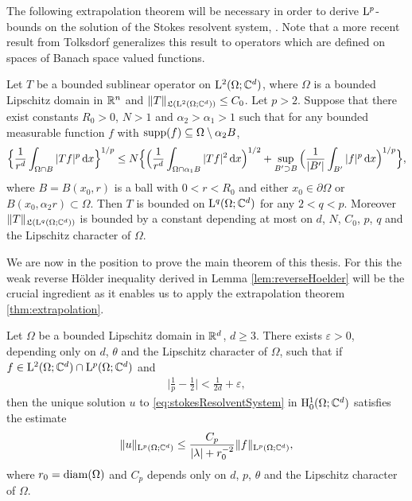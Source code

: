 The following extrapolation theorem will be necessary in order to derive $\mathrm{L}^p$-bounds on the solution of the Stokes resolvent system, \cite[Thm. 3.3]{shenExtrapolation}.
Note that a more recent result from Tolksdorf \cite{tolksdorfExtra} generalizes this result to operators which are defined on spaces of Banach space valued functions.

\begin{thm}
  \label{thm:extrapolation}
  Let $T$ be a bounded sublinear operator on $\mathrm{L}^2(\Omega; \mathbb{C}^d)$, where $\Omega$ is a bounded Lipschitz domain in $\mathbb{R}^n$ and $\|T\|_{\mathfrak{L}(\mathrm{L}^2(\Omega; \mathbb{C}^d))} \leq C_0$.
  Let $p > 2$.
  Suppose that there exist constants $R_0 > 0$, $N > 1$ and $\alpha_2 > \alpha_1 > 1$ such that for any bounded measurable function $f$ with $\operatorname{supp}(f) \subseteq \Omega \setminus \alpha_2 B$,
  \begin{align*}
    \Big\{ \frac{1}{r^d} \int_{\Omega \cap B} |Tf|^p \, {\operatorname{d}\!{x}} \Big\}^{1/p}
    \leq N \Big\{ \Big( \frac{1}{r^d} \int_{\Omega \cap \alpha_1 B} |T f|^2 \, {\operatorname{d}\!{x}} \Big)^{1/2} + \sup_{B' \supset B} \Big( \frac{1}{|B'|} \int_{B'} |f|^p \, {\operatorname{d}\!{x}} \Big)^{1/p} \Big\},
  \end{align*}
  where $B = B(x_0, r)$ is a ball with $0 < r < R_0$ and either $x_0 \in \partial\Omega$ or $B(x_0, \alpha_2 r) \subset \Omega$.
  Then $T$ is bounded on $\mathrm{L}^q(\Omega; \mathbb{C}^d)$ for any $2 < q < p$.
  Moreover $\|T\|_{\mathfrak{L}(\mathrm{L}^q(\Omega; \mathbb{C}^d))}$ is bounded by a constant depending at most on $d$, $N$, $C_0$, $p$, $q$ and the Lipschitz character of $\Omega$.
\end{thm}

We are now in the position to prove the main theorem of this thesis. For this the weak reverse H\"older inequality derived in Lemma \ref{lem:reverseHoelder} will be the crucial ingredient as it enables us to apply the extrapolation theorem \ref{thm:extrapolation}.

\begin{thm}[Shen]
  Let $\Omega$ be a bounded Lipschitz domain in $\mathbb{R}^d$, $d \geq 3$.
  There exists $\varepsilon > 0$, depending only on $d$, $\theta$ and the Lipschitz character of $\Omega$, such that if $f \in \mathrm{L}^2(\Omega; \mathbb{C}^d) \cap \mathrm{L}^p(\Omega; \mathbb{C}^d)$ and 
  \begin{align*}
    \Big| \frac{1}{p} - \frac{1}{2} \Big| < \frac{1}{2d} + \varepsilon,
  \end{align*}
  then the unique solution $u$ to \eqref{eq:stokesResolventSystem} in $\mathrm{H}_0^1(\Omega; \mathbb{C}^d)$ satisfies the estimate
  \begin{align*}
    \|u\|_{\mathrm{L}^p(\Omega; \mathbb{C}^d)} \leq \frac{C_p}{|\lambda| + r_0^{-2}} \|f\|_{\mathrm{L}^p(\Omega; \mathbb{C}^d)},
  \end{align*}
  where $r_0 = \operatorname{diam}(\Omega)$ and $C_p$ depends only on $d$, $p$, $\theta$ and the Lipschitz character of $\Omega$.
\end{thm}

